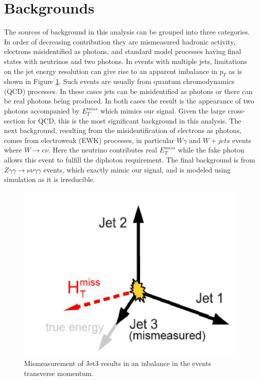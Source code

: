 \section{Backgrounds}
The sources of background in this analysis can be grouped into three categories.  In order of decreasing contribution they are mismeasured hadronic activity, electrons misidentified as photons, and standard model processes having final states with neutrinos and two photons.  In events with multiple jets, limitations on the jet energy resolution can give rise to an apparent imbalance in $p_T$ as is shown in Figure \ref{fig:fakemet}.  Such events are usually from quantum chromodynamics (QCD) processes.  In these cases jets can be misidentified as photons or there can be real photons being produced.  In both cases the result is the appearance of two photons accompanied by $E^{miss}_T$ which mimics our signal.  Given the large cross-section for QCD, this is the most significant background in this analysis.  The next background, resulting from the misidentification of electrons as photons, comes from electroweak (EWK) processes, in particular $W\gamma$ and $W + jets$ events where $W \rightarrow e\nu$.  Here the neutrino contributes real $E^{miss}_T$ while the fake photon allows this event to fulfill the diphoton requirement.  The final background is from $Z\gamma \gamma \rightarrow \nu \nu \gamma \gamma$ events, which exactly mimic our signal, and is modeled using simulation as it is irreducible.

\begin{figure}
	\centering
	\includegraphics[width=0.5\linewidth]{Figures/FakeMET}
	\caption{Mismeasurement of Jet3 results in an inbalance in the events transverse momentum.}
	\label{fig:fakemet}
\end{figure}

